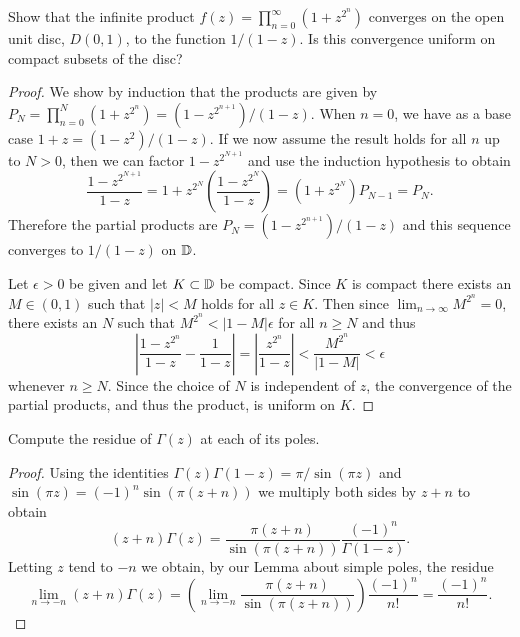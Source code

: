 \documentclass[10pt]{amsart}
\begin{document}
\begin{thm}
  \label{Ex3}
  Show that the infinite product $f(z) = \prod_{n=0}^{\infty}(1 + z^{2^n})$ converges on the open unit disc, $D(0,1)$, to the function $1/(1-z)$.
  Is this convergence uniform on compact subsets of the disc?
  
  \begin{proof}
    We show by induction that the products are given by $P_N = \prod_{n=0}^{N} (1 + z^{2^n}) = (1- z^{2^{n+1}})/(1-z)$.
    When $n=0$, we have as a base case $1 + z = (1-z^2)/(1-z)$.
    If we now assume the result holds for all $n$ up to $N > 0$, then we can factor $1 - z^{2^{N+1}}$ and use the induction hypothesis to obtain
    $$\frac{1-z^{2^{N+1}}}{1-z} = 1 + z^{2^{N}}\left(\frac{1 - z^{2^{N}}}{1 - z}\right) = (1+z^{2^N})P_{N-1} = P_N.$$
    Therefore the partial products are $P_N = (1- z^{2^{n+1}})/(1-z)$ and this sequence converges to $1/(1-z)$ on $\mathbb{D}$.
    
    Let $\epsilon > 0$ be given and let $K \subset \mathbb{D}$ be compact.
    Since $K$ is compact there exists an $M \in (0,1)$ such that $|z| < M$ holds for all $z \in K$.
    Then since $\lim_{n\rightarrow\infty}M^{2^n} = 0$, there exists an $N$ such that $M^{2^n} < |1 - M| \epsilon$ for all $n \geq N$ and thus
    $$\left|\frac{1 - z^{2^n}}{1-z} - \frac{1}{1-z}\right| = \left| \frac{z^{2^n}}{1-z}\right| <  \frac{M^{2^n}}{|1-M|} < \epsilon$$
    whenever $n \geq N$.
    Since the choice of $N$ is independent of $z$, the convergence of the partial products, and thus the product, is uniform on $K$.
   \end{proof}
\end{thm}

\begin{thm}
  \label{Ex4}
  Compute the residue of $\Gamma(z)$ at each of its poles.
  \begin{proof}
    Using the identities $\Gamma(z)\Gamma(1-z) = \pi/\sin(\pi z)$ and $\sin(\pi z) = (-1)^n\sin(\pi (z + n))$ we multiply both sides by $z+n$ to obtain
    $$(z + n)\Gamma(z) = \frac{\pi(z+n)}{\sin(\pi(z+n))} \frac{(-1)^n}{\Gamma(1-z)}.$$
    Letting $z$ tend to $-n$ we obtain, by our Lemma about simple poles, the residue
    $$\lim_{n\rightarrow -n} (z+n)\Gamma(z) = \left(\lim_{n\rightarrow -n} \frac{\pi(z+n)}{\sin(\pi(z+n))}\right) \frac{(-1)^n}{n!} = \frac{(-1)^n}{n!}.$$
  \end{proof}
\end{thm}
\end{document}
